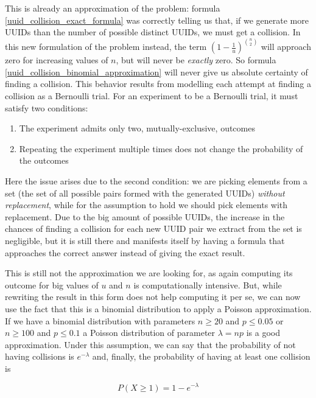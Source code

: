 \documentclass{report}
\begin{document}
This is already an approximation of the problem: formula \ref{uuid_collision_exact_formula} was correctly telling us that, if we generate more UUIDs than the number of
possible distinct UUIDs, we must get a collision. In this new formulation of the problem instead, the term $(1-\frac{1}{u})^{\binom{n}{2}}$ will approach zero for increasing values of
$n$, but will never be \emph{exactly} zero. So formula \ref{uuid_collision_binomial_approximation} will never give us absolute certainty of finding a collision. This behavior
results from modelling each attempt at finding a collision as a Bernoulli trial. For an experiment to be a Bernoulli trial, it must satisfy two conditions: 
\begin{enumerate}
		\item The experiment admits only two, mutually-exclusive, outcomes
		\item Repeating the experiment multiple times does not change the probability of the outcomes
\end{enumerate}
Here the issue arises due to the second condition: we are picking elements from a set (the set of all possible pairs formed with the generated UUIDs) \emph{without replacement}, while
for the assumption to hold we should pick elements with replacement. Due to the big amount of possible UUIDs, the increase in the chances of finding a collision for each new UUID
pair we extract from the set is negligible, but it is still there and manifests itself by having a formula that approaches the correct answer instead of giving the exact result. \par

This is still not the approximation we are looking for, as again computing its outcome for big values of $u$ and $n$ is computationally intensive.
But, while rewriting the result in this form does not help computing it per se, we can now use the fact that this is a binomial distribution to apply a Poisson approximation. If we have
a binomial distribution with parameters $n \geq 20$ and $p \leq 0.05$ or $n \geq 100$ and $p \leq 0.1$ a Poisson distribution of parameter $\lambda=np$ is a good approximation. Under this assumption, we can say that the
probability of not having collisions is $e^{-\lambda}$ and, finally, the probability of having at least one collision is

\begin{equation} \label{uuid_collision_poisson_approximation}
		P(X \geq 1)=1-e^{-\lambda}
\end{equation}
\end{document}

